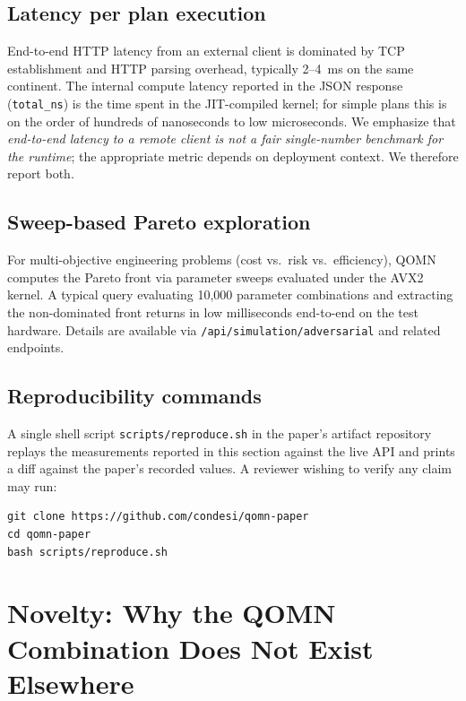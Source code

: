 \documentclass[11pt,a4paper]{article}
\begin{document}
\subsection{Latency per plan execution}

End-to-end HTTP latency from an external client is dominated by TCP establishment and HTTP parsing overhead, typically 2--4~ms on the same continent. The internal compute latency reported in the JSON response (\texttt{total\_ns}) is the time spent in the JIT-compiled kernel; for simple plans this is on the order of hundreds of nanoseconds to low microseconds. We emphasize that \emph{end-to-end latency to a remote client is not a fair single-number benchmark for the runtime}; the appropriate metric depends on deployment context. We therefore report both.

\subsection{Sweep-based Pareto exploration}

For multi-objective engineering problems (cost vs.\ risk vs.\ efficiency), QOMN computes the Pareto front via parameter sweeps evaluated under the AVX2 kernel. A typical query evaluating 10{,}000 parameter combinations and extracting the non-dominated front returns in low milliseconds end-to-end on the test hardware. Details are available via \texttt{/api/simulation/adversarial} and related endpoints.

\subsection{Reproducibility commands}

A single shell script \texttt{scripts/reproduce.sh} in the paper's artifact repository replays the measurements reported in this section against the live API and prints a diff against the paper's recorded values. A reviewer wishing to verify any claim may run:

\begin{lstlisting}
git clone https://github.com/condesi/qomn-paper
cd qomn-paper
bash scripts/reproduce.sh
\end{lstlisting}

\section{Novelty: Why the QOMN Combination Does Not Exist Elsewhere}
\label{sec:novelty}
\end{document}
